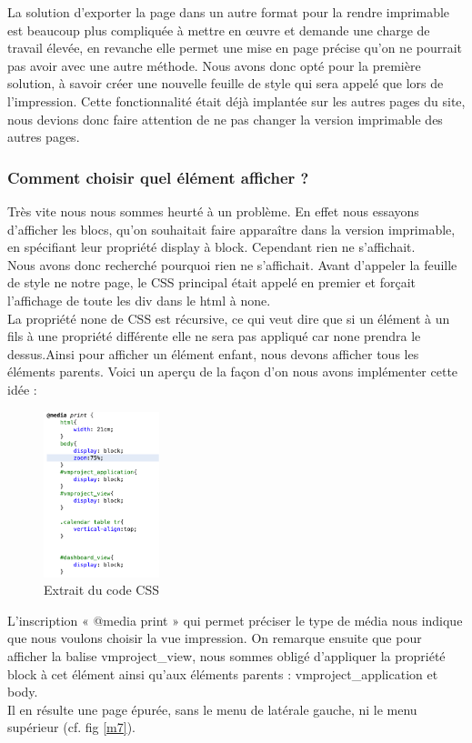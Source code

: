 \documentclass[12pt]{report}
\begin{document}
\begin{enumerate}
La solution d’exporter la page dans un autre format pour la rendre imprimable est beaucoup plus compliquée à mettre en œuvre et demande une charge de travail élevée, en revanche elle permet une mise en page précise qu’on ne pourrait pas avoir avec une autre méthode. Nous avons donc opté pour la première solution, à savoir créer une nouvelle feuille de style qui sera appelé que lors de l’impression. Cette fonctionnalité était déjà implantée sur les autres pages du site, nous devions donc faire attention de ne pas changer la version imprimable des autres pages.\\

\subsubsection{Comment choisir quel élément afficher ?}
Très vite nous nous sommes heurté à un problème. En effet nous essayons d’afficher les blocs, qu’on souhaitait faire apparaître dans la version imprimable, en spécifiant leur propriété display à block. Cependant rien ne s’affichait.\\

Nous avons donc recherché pourquoi rien ne s’affichait. Avant d’appeler la feuille de style ne notre page, le CSS principal était appelé en premier et forçait l’affichage de toute les div dans le html à none.\\

La propriété none de CSS est récursive, ce qui veut dire que si un élément à un fils à une propriété différente elle ne sera pas appliqué car none prendra le dessus.Ainsi pour afficher un élément enfant, nous devons afficher tous les éléments parents. Voici un aperçu de la façon d’on nous avons implémenter cette idée :\\

\begin{figure}[H]
	\centering
	\includegraphics[width=0.3\textwidth]{pictures/matthieu/m_css_imprimabe.png}
	\caption{Extrait du code CSS}
	\label{m6}
\end{figure}

L’inscription « @media print » qui permet préciser le type de média nous indique que nous voulons choisir la vue impression. On remarque ensuite que pour afficher la balise vmproject\_view, nous sommes obligé d’appliquer la propriété block à cet élément ainsi qu’aux éléments parents : vmproject\_application et body.\\

Il en résulte une page épurée, sans le menu de latérale gauche, ni le menu supérieur (cf. fig \ref{m7}).

\end{enumerate}
	
\end{document}
